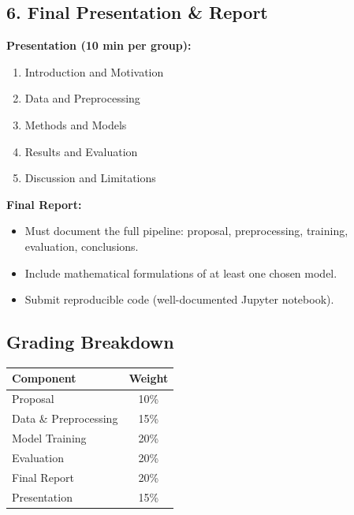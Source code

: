 \documentclass[a4paper,10pt]{article}
\begin{document}
\subsection*{6. Final Presentation \& Report }
\textbf{Presentation (10 min per group):}
\begin{enumerate}
    \item Introduction and Motivation
    \item Data and Preprocessing
    \item Methods and Models
    \item Results and Evaluation
    \item Discussion and Limitations
\end{enumerate}

\textbf{Final Report:}
\begin{itemize}
    \item Must document the full pipeline: proposal, preprocessing, training, evaluation, conclusions.
    \item Include mathematical formulations of at least one chosen model.
    \item Submit reproducible code (well-documented Jupyter notebook).
\end{itemize}

\subsection*{Grading Breakdown}
\begin{center}
\begin{tabular}{l c}
    \hline
    Component & Weight \\
    \hline
    Proposal & 10\% \\
    Data \& Preprocessing & 15\% \\
    Model Training & 20\% \\
    Evaluation & 20\% \\
    Final Report & 20\% \\
    Presentation & 15\% \\
    \hline
\end{tabular}
\end{center}

\newpage
\end{document}

